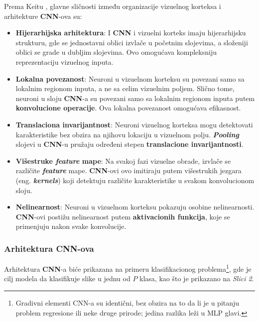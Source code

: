 \documentclass[12pt]{article}
\begin{document}
   Prema Keitu \cite{human_visual_cortex}, glavne sličnosti između organizacije vizuelnog korteksa i arhitekture \textbf{CNN}-ova su:
   \begin{itemize}
   \item \textbf{Hijerarhijska arhitektura}: I \textbf{CNN} i vizuelni korteks imaju hijerarhijsku strukturu, 
   gde se jednostavni oblici izvlače u početnim slojevima, a složeniji oblici se grade u dubljim slojevima. 
   Ovo omogućava kompleksniju reprezentaciju vizuelnog inputa.
   \item \textbf{Lokalna povezanost}: Neuroni u vizuelnom korteksu su povezani samo sa 
   lokalnim regionom inputa, a ne sa celim vizuelnim poljem. Slično tome, neuroni 
   u sloju \textbf{CNN}-a su povezani samo sa lokalnim regionom inputa putem \textbf{konvolucione operacije}. 
   Ova lokalna povezanost omogućava efikasnost.
   \item \textbf{Translaciona invarijantnost}: Neuroni vizuelnog korteksa mogu detektovati karakteristike
    bez obzira na njihovu lokaciju u vizuelnom polju. \textbf{\textit{Pooling}} slojevi u \textbf{CNN}-u pružaju određeni 
    stepen \textbf{translacione invarijantnosti}.
    \item \textbf{Višestruke \textit{feature} mape}: Na svakoj fazi vizuelne obrade, izvlače se različite \textbf{\textit{feature}} mape.
    \textbf{CNN}-ovi ovo imitiraju putem višestrukih jezgara (eng. \textbf{\textit{kernels}}) koji detektuju različite karakteristike
      u svakom konvolucionom sloju.
   \item \textbf{Nelinearnost}: Neuroni u vizuelnom korteksu pokazuju osobine nelinearnosti. 
   \textbf{CNN}-ovi postižu nelinearnost putem \textbf{aktivacionih funkcija}, koje se primenjuju nakon svake konvolucije.
   
   \end{itemize}
   
   \newpage

   \subsubsection{Arhitektura CNN-ova}
   Arhitektura \textbf{CNN}-a biće prikazana na primeru klasifikacionog
    problema\footnote{Gradivni elementi CNN-a su identični, bez obzira na to
     da li je u pitanju problem regresione ili neke druge prirode; jedina razlika leži u MLP glavi.}, 
     gde je cilj modela da klasifikuje slike u jednu od $P$ klasa, kao što je prikazano na \textit{Slici 2}.
\end{document}
